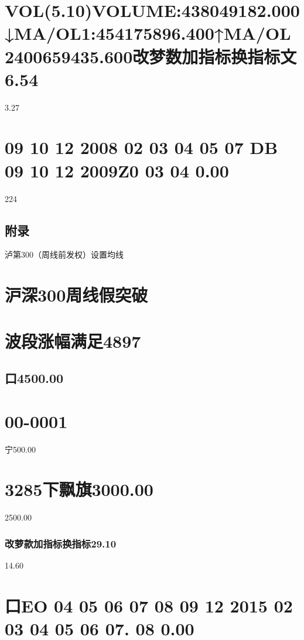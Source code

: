 \documentclass{article}
\begin{document}
\section{VOL(5.10)VOLUME:438049182.000↓MA/OL1:454175896.400↑MA/OL2400659435.600改梦数加指标换指标文6.54}

3.27

\section{09 10 12 2008 02 03 04 05 07 DB 09 10 12 2009Z0 03 04 0.00}

224

\clearpage

\subsection{附录}

泸第300（周线前发权）设置均线

\section{沪深300周线假突破}

\section{波段涨幅满足4897}

\subsection{口4500.00}

\section{00-0001}

宁500.00

\section{3285下飘旗3000.00}

2500.00

\subsubsection{改萝款加指标换指标29.10}

14.60

\section{口EO 04 05 06 07 08 09 12 2015 02 03 04 05 06 07. 08 0.00}
\end{document}
